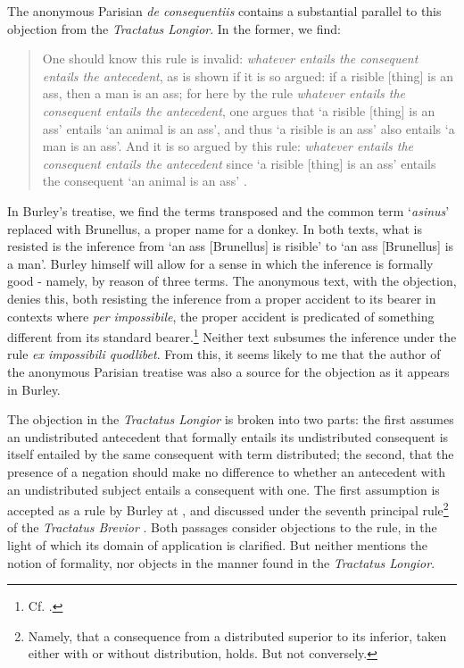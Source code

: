 \documentclass[]{article}
\begin{document}
The anonymous Parisian \textit{de consequentiis} contains a substantial parallel to this objection from the \textit{Tractatus Longior}. In the former, we find: 
\begin{quote}
	One should know this rule is invalid: \textit{whatever entails the consequent entails the antecedent}, as is shown if it is so argued: if a risible [thing] is an ass, then a man is an ass; for here by the rule \textit{whatever entails the consequent entails the antecedent}, one argues that `a risible [thing] is an ass' entails `an animal is an ass', and thus `a risible is an ass' also entails `a man is an ass'. And it is so argued by this rule: \textit{whatever entails the consequent entails the antecedent} since `a risible [thing] is an ass' entails the consequent `an animal is an ass' \cite[p. 16, par. 21]{Green-Pedersen1980a}.
\end{quote}
In Burley's treatise, we find the terms transposed and the common term `\textit{asinus}' replaced with Brunellus, a proper name for a donkey. In both texts, what is resisted is the inference from `an ass [Brunellus] is risible' to `an ass [Brunellus] is a man'. Burley himself will allow for a sense in which the inference is formally good - namely, by reason of three terms. The anonymous text, with the objection, denies this, both resisting the inference from a proper accident to its bearer in contexts where \textit{per impossibile}, the proper accident is predicated of something different from its standard bearer.\footnote{Cf. \cite[q. 11, par. 19]{ScotusQE}.} Neither text subsumes the inference under the rule \textit{ex impossibili quodlibet}. From this, it seems likely to me that the author of the anonymous Parisian treatise was also a source for the objection as it appears in Burley.

The objection in the \textit{Tractatus Longior} is broken into two parts: the first assumes an undistributed antecedent that formally entails its undistributed consequent is itself entailed by the same consequent with term distributed; the second, that the presence of a negation should make no difference to whether an antecedent with an undistributed subject entails a consequent with one. The first assumption is accepted as a rule by Burley at \cite[pp. 117-118, par. 26-31]{Green-Pedersen1980b}, and discussed under the seventh principal rule\footnote{Namely, that a consequence from a distributed superior to its inferior, taken either with or without distribution, holds. But not conversely.} of the \textit{Tractatus Brevior} \cite[p. 211.21-212.28]{BurleyDPAL}. Both passages consider objections to the rule, in the light of which its domain of application is clarified. But neither mentions the notion of formality, nor objects in the manner found in the \textit{Tractatus Longior}. 
\end{document}
